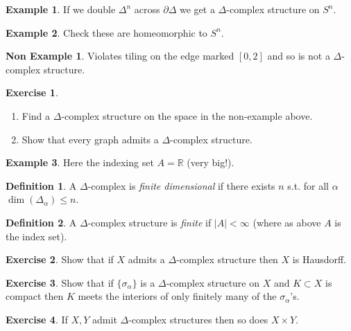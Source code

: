 \documentclass[12pt]{article}
\theoremstyle{definition}
\theoremstyle{definition}
\newtheorem*{defn}{Definition}
\newtheorem*{ex}{Example}
\newtheorem*{nex}{Non Example}
\newtheorem*{exer}{Exercise}
\newcommand{\RR}{\mathbb{R}}
\begin{document}
\begin{ex}
If we double $\Delta^n$ across $\partial \Delta$ we get a $\Delta$-complex structure on $S^n$.
\end{ex}

\begin{ex}
Check these are homeomorphic to $S^n$.
\end{ex}

\begin{nex}
Violates tiling on the edge marked $[0,2]$ and so is not a $\Delta$-complex structure.
\end{nex}

\begin{exer}
\begin{enumerate}
\item Find a $\Delta$-complex structure on the space in the non-example above.
\item Show that every graph admits a $\Delta$-complex structure.
\end{enumerate}
\end{exer}

\begin{ex}
Here the indexing set $A = \RR$ (very big!).
\end{ex}

\begin{defn}
A $\Delta$-complex is \emph{finite dimensional} if there exists $n$ s.t. for all $\alpha$ $\dim(\Delta_\alpha) \le n$.
\end{defn}

\begin{defn}
A $\Delta$-complex structure is \emph{finite} if $|A| < \infty$ (where as above $A$ is the index set).
\end{defn}

\begin{exer}
Show that if $X$ admits a $\Delta$-complex structure then $X$ is Hausdorff.
\end{exer}

\begin{exer}
Show that if $\{\sigma_\alpha\}$ is a $\Delta$-complex structure on $X$ and $K\subset X$ is compact then $K$ meets the interiors of only finitely many of the $\sigma_\alpha$'s.
\end{exer}

\begin{exer}
If $X,Y$ admit $\Delta$-complex structures then so does $X\times Y$.
\end{exer}
\end{document}
